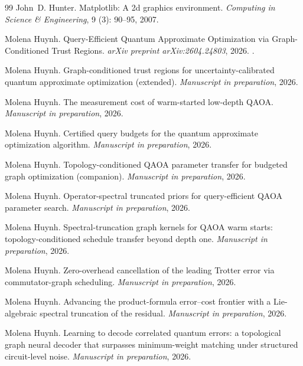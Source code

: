 \documentclass[reprint,aps,prxquantum,amsmath,amssymb,floatfix,nofootinbib,longbibliography]{revtex4-2}
\theoremstyle{definition}
\theoremstyle{remark}
\theoremstyle{plain}
\begin{document}
\begin{thebibliography}{99}
John~D. Hunter.
\newblock Matplotlib: A 2d graphics environment.
\newblock \emph{Computing in Science \& Engineering}, 9 (3):
  90--95, 2007.

Molena Huynh.
\newblock Query-Efficient Quantum Approximate Optimization via
  Graph-Conditioned Trust Regions.
\newblock \emph{arXiv preprint arXiv:2604.24803}, 2026.
\newblock {}.

Molena Huynh.
\newblock Graph-conditioned trust regions for uncertainty-calibrated quantum
  approximate optimization (extended).
\newblock \emph{Manuscript in preparation}, 2026.

Molena Huynh.
\newblock The measurement cost of warm-started low-depth {QAOA}.
\newblock \emph{Manuscript in preparation}, 2026.

Molena Huynh.
\newblock Certified query budgets for the quantum approximate optimization
  algorithm.
\newblock \emph{Manuscript in preparation}, 2026.

Molena Huynh.
\newblock Topology-conditioned {QAOA} parameter transfer for budgeted graph
  optimization (companion).
\newblock \emph{Manuscript in preparation}, 2026.

Molena Huynh.
\newblock Operator-spectral truncated priors for query-efficient {QAOA}
  parameter search.
\newblock \emph{Manuscript in preparation}, 2026.

Molena Huynh.
\newblock Spectral-truncation graph kernels for {QAOA} warm starts:
  topology-conditioned schedule transfer beyond depth one.
\newblock \emph{Manuscript in preparation}, 2026.

Molena Huynh.
\newblock Zero-overhead cancellation of the leading {Trotter} error via
  commutator-graph scheduling.
\newblock \emph{Manuscript in preparation}, 2026.

Molena Huynh.
\newblock Advancing the product-formula error--cost frontier with a
  {Lie}-algebraic spectral truncation of the residual.
\newblock \emph{Manuscript in preparation}, 2026.

Molena Huynh.
\newblock Learning to decode correlated quantum errors: a topological graph
  neural decoder that surpasses minimum-weight matching under structured
  circuit-level noise.
\newblock \emph{Manuscript in preparation}, 2026.


\end{thebibliography}
\end{document}
